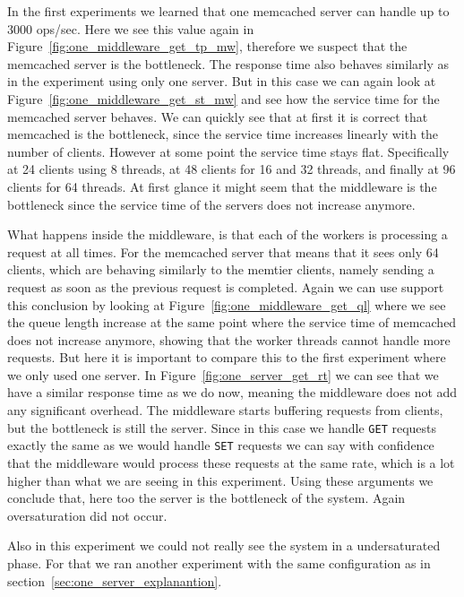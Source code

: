 \documentclass[11pt,a4paper]{article}
\begin{document}
%
In the first experiments we learned that one memcached server can handle up to 3000 ops/sec.
%
Here we see this value again in Figure~\ref{fig:one_middleware_get_tp_mw}, therefore we suspect that the memcached server is the bottleneck.
%
The response time also behaves similarly as in the experiment using only one server.
%
But in this case we can again look at Figure~\ref{fig:one_middleware_get_st_mw} and see how the service time for the memcached server behaves.
%
We can quickly see that at first it is correct that memcached is the bottleneck, since the service time increases linearly with the number of clients.
%
However at some point the service time stays flat.
%
Specifically at 24 clients using 8 threads, at 48 clients for 16 and 32 threads, and finally at 96 clients for 64 threads. 
%
At first glance it might seem that the middleware is the bottleneck since the service time of the servers does not increase anymore.
%
\par
What happens inside the middleware, is that each of the workers is processing a request at all times. 
%
For the memcached server that means that it sees only 64 clients, which are behaving similarly to the memtier clients, namely sending a request as soon as the previous request is completed.
%
Again we can use support this conclusion by looking at Figure~\ref{fig:one_middleware_get_ql} where we see the queue length increase at the same point where the service time of memcached does not increase anymore, showing that the worker threads cannot handle more requests.
%
But here it is important to compare this to the first experiment where we only used one server.
%
In Figure~\ref{fig:one_server_get_rt} we can see that we have a similar response time as we do now, meaning the middleware does not add any significant overhead.
%
The middleware starts buffering requests from clients, but the bottleneck is still the server.
%
Since in this case we handle \texttt{GET} requests exactly the same as we would handle \texttt{SET} requests we can say with confidence that the middleware would process these requests at the same rate, which is a lot higher than what we are seeing in this experiment.
%
Using these arguments we conclude that, here too the server is the bottleneck of the system.
%
Again oversaturation did not occur.
%
\par
%
Also in this experiment we could not really see the system in a undersaturated phase.
%
For that we ran another experiment with the same configuration as in section~\ref{sec:one_server_explanantion}.
%
%
\end{document}
